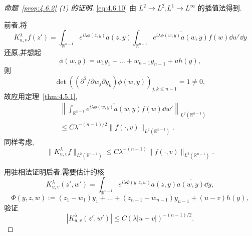 \begin{proof}[命题~\ref{prop:4.6.2} (1) 的证明]
\eqref{eq:4.6.10} 由 $L^{2} \to L^{2}$,$L^{1} \to L^{\infty}$ 的插值法得到.

前者,将
\begin{equation}
K_{u,v}^{\lambda}f(z') = \int_{\mathbb{R}^{n-1}}e^{i\lambda\phi(z, y)}a(z, y)\int_{\mathbb{R}^{n-1}}\overline{e^{i\lambda\phi(w, y)}a(w, y)}f(w)\dd w'\dd y
\end{equation}
还原,并想起
\begin{equation*}
\phi(w, y) = w_{1}y_{1} + \ldots + w_{n-1}y_{n-1} + uh(y),
\end{equation*}
则
\begin{equation*}
\det\left(\left(\partial^{2}/\partial w_{j}\partial y_{k}\right)\phi(w, y)\right)_{j, k \leq n-1} = 1 \neq 0,
\end{equation*}
故应用定理~\ref{thm:4.5.1},
\begin{equation}
\begin{aligned}
& \left\|\int_{\mathbb{R}^{n-1}}\overline{e^{i\lambda\phi(w, y)}a(w, y)}f(w)\dd w'\right\|_{L^{2}(\mathbb{R}^{n-1})} \\
& \leq C\lambda^{-(n-1)/2}\|f(\cdot, v)\|_{L^{2}(\mathbb{R}^{n-1})}.
\end{aligned}
\end{equation}
同样考虑,
\begin{equation}
\|K_{u,v}^{\lambda}f\|_{L^{2}(\mathbb{R}^{n-1})} \leq C\lambda^{-(n-1)}\|f(\cdot, v)\|_{L^{2}(\mathbb{R}^{n-1})}.\tag{4.6.11}
\label{eq:4.6.11}\end{equation}

用驻相法证明后者.需要估计的核
\begin{equation}
K_{u,v}^{\lambda}(z', w') = \int_{\mathbb{R}^{n-1}}e^{i\lambda\Phi(y, z, w)}a(z, y)\overline{a(w, y)}\dd y,
\end{equation}
\begin{equation*}
\Phi(y, z, w) := (z_{1} - w_{1})y_{1} + \ldots + (z_{n-1} - w_{n-1})y_{n-1} + (u - v)h(y),
\end{equation*}
验证
\begin{equation}
|K_{u,v}^{\lambda}(z', w')| \leq C(\lambda|u - v|)^{-(n-1)/2}.\tag{4.6.12}
\label{eq:4.6.12}\end{equation}


\end{proof}
